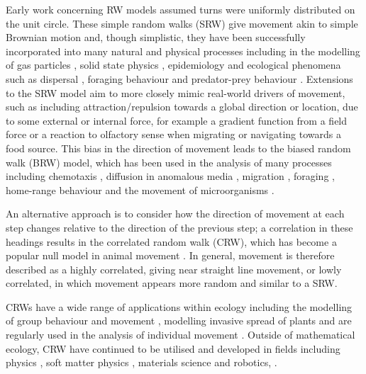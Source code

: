 \documentclass[english]{article}
\begin{document}
Early work concerning RW models assumed turns were uniformly distributed on the unit circle.  These simple random walks (SRW) give movement akin to simple Brownian motion and, though simplistic, they have been successfully incorporated into many natural and physical processes including in the modelling of gas particles \citep{weiss1983random}, solid state physics \citep{weiss1983brandom}, epidemiology \citep{fofana2017mechanistic,white2018dynamic} and ecological phenomena such as dispersal \citep{skellam1951random,turchin1998quantitative,okubo2001diffusion}, foraging behaviour \citep{bell1990} and predator-prey behaviour \citep{kareiva1990population}.  Extensions to the SRW model aim to more closely mimic real-world drivers of movement, such as including attraction/repulsion towards a global direction or location, due to some external or internal  force, for example a gradient function from a field force or a reaction to olfactory sense when migrating or navigating towards a food source.  This bias in the direction of movement leads to the biased random walk (BRW) model, which has been used in the analysis of many processes including chemotaxis \citep{alt1980biased,codling2008random}, diffusion in anomalous media \citep{bouchaud1990anomalous}, migration \citep{saul2012individual,papastamatiou2013telemetry}, foraging \citep{farnsworth1999grazers,barton2009evolution}, home-range behaviour \citep{borger2008there,breed2017predicting} and the movement of microorganisms \citep{hill1997biased}.  

An alternative approach is to consider how the direction of movement at each step changes relative to the direction of the previous step; a correlation in these headings results in the correlated random walk (CRW), which has become a popular null model in animal movement \citep{fagan2014correlated}.    
In general, movement is therefore described as a highly correlated, giving near straight line movement, or lowly correlated, in which movement appears more random and similar to a SRW.  

CRWs have a wide range of applications within ecology including the modelling of group behaviour and movement \citep{haydon2008socially,codling2014copycat}, modelling invasive spread of plants \citep{andersen2005risk} and are regularly used in the analysis of individual movement \citep{mcclintock2018momentuhmm,grant2018predicting,bailey2021walking}.  Outside of mathematical ecology, CRW have continued to be utilised and developed in fields including physics \citep{cressoni2013exact,sadjadi2015persistent,yuste2024gaseous}, soft matter physics \citep{liu2021correlated}, materials science \citep{bonilla2012multicomponent} and robotics, \citep{dimidov2016random,pang2021effect}. 
\end{document}
